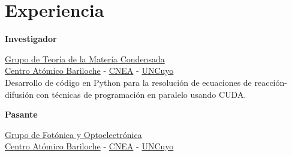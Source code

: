 \documentclass[a4paper,10pt]{article}
\begin{document}
%
\hfill
\begin{adjustbox}{valign=t}
\begin{minipage}{0.02\textwidth} %
\MyVerticalRule  %
\end{minipage}
\end{adjustbox}
\hfill
%
\begin{adjustbox}{valign=t}
\begin{minipage}{0.5\textwidth} %

\section*{Experiencia}
\begin{description}
\raggedright
\item[\normalfont \textcolor{ColorOne}{Ago. 2021 -- Dic. 2022.}] \textbf{Investigador}\\ \medskip

\href{https://fisica.cab.cnea.gov.ar/solidos/}{\textcolor{ColorTwo}{Grupo de Teoría de la Matería Condensada}} \\ 
\href{https://fisica.cab.cnea.gov.ar/}{\textcolor{ColorTwo}{Centro Atómico Bariloche}} 
\textcolor{ColorTwo}{-} \href{https://www.argentina.gob.ar/cnea}{\textcolor{ColorTwo}{CNEA}} \textcolor{ColorTwo}{-}
\href{https://www.uncuyo.edu.ar/}{\textcolor{ColorTwo}{UNCuyo}}\\

Desarrollo de código en Python para la resolución de ecuaciones de reacción-difusión con técnicas de programación en paralelo usando CUDA. 

\item[\normalfont \textcolor{ColorOne}{May. 2021 -- Sep. 2021.}] \textbf{Pasante}\\ \medskip

\href{https://fisica.cab.cnea.gov.ar/pop/}{\textcolor{ColorTwo}{Grupo de Fotónica y Optoelectrónica}} \\ 
\href{https://fisica.cab.cnea.gov.ar/}{\textcolor{ColorTwo}{Centro Atómico Bariloche}} 
\textcolor{ColorTwo}{-} \href{https://www.argentina.gob.ar/cnea}{\textcolor{ColorTwo}{CNEA}} \textcolor{ColorTwo}{-}
\href{https://www.uncuyo.edu.ar/}{\textcolor{ColorTwo}{UNCuyo}}\\
	

\end{description}
\end{minipage}
\end{adjustbox}
\end{document}
